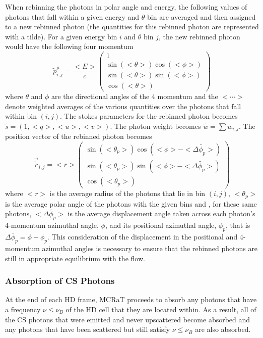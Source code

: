\documentclass[12pt,a4paper]{article}
\begin{document}
When rebinning the photons in polar angle and energy, the following values of photons that fall within a given energy and $\theta$ bin are averaged and then assigned to a new rebinned photon (the quantities for this rebinned photon are represented with a tilde). For a given energy bin $i$ and $\theta$ bin $j$, the new rebinned photon would have the following four momentum  
\[
\tilde{p}^\mu_{i,j}=\frac{<E>}{c}\begin{pmatrix}
1 \\ \sin(<\theta>) \cos(<\phi>) \\ \sin(<\theta>) \sin(<\phi>) \\ \cos(<\theta>)
\end{pmatrix}
\]
where $\theta$ and $\phi$ are the directional angles of the 4 momentum and the $<\cdots>$ denote weighted averages of the various quantities over the photons that fall within bin $(i,j)$. The stokes parameters for the rebinned photon becomes $\tilde{s}=(1,<q>,<u>,<v>)$. The photon weight becomes $\tilde{w}=\sum w_{i,j}$. The position vector of the rebinned photon becomes
 \[
 \overrightarrow{\tilde{r}}_{i,j}=<r>\begin{pmatrix}
  \sin(<\theta_p>) \cos(<\phi>-<\Delta \tilde{\phi_p}>) \\ \sin(<\theta_p>) \sin(<\phi>-<\Delta \tilde{\phi_p}>) \\ \cos(<\theta_p>)
 \end{pmatrix}
 \]
 where $<r>$ is the average radius of the photons that lie in bin $(i,j)$, $<\theta_p>$ is the average polar angle of the photons with the given bins and , for these same photons, $<\Delta \tilde{\phi_p}>$ is the average displacement angle taken across each photon's 4-momentum azimuthal angle, $\phi$, and its positional azimuthal angle, $\phi_p$, that is $\Delta \tilde{\phi_p}= \phi-\phi_p$. This consideration of the displacement in the positional and 4-momentum azimuthal angles is necessary to ensure that the rebinned photons are still in appropriate equilibrium with the flow. 


\subsubsection{Absorption of CS Photons}
At the end of each HD frame, MCRaT proceeds to absorb any photons that have a frequency  $\nu \le \nu_B$ of the HD cell that they are located within. As a result, all of the CS photons that were emitted and never upscattered become absorbed and any photons that have been scattered but still satisfy  $\nu \le \nu_B$ are also absorbed.



\end{document}

